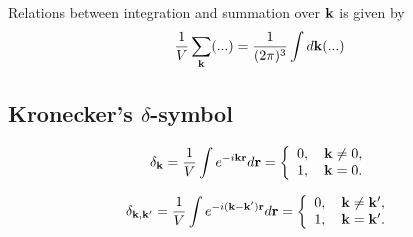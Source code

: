 Relations between integration and summation over $\vb k$ is given by
\begin{equation}
	\frac{1}{V}\sum_{\vb k} (...) = \frac{1}{(2\pi)^3}\int d{\vb k} (...)
\end{equation}

\subsection*{Kronecker's $\delta$-symbol}

\begin{equation}
	\delta_{\vb k} = \frac{1}{V} \int e^{-i\vb k \vb r} d{\vb r} = 
	\left\{
	\begin{array}{cc}
		0, \quad \vb k \neq 0, \\
		1, \quad \vb k = 0.
	\end{array}
	\right.
\end{equation}

\begin{equation}
	\delta_{\vb k, \vb k'} = \frac{1}{V} \int e^{-i(\vb k - \vb k') \vb r} d{\vb r} = 
	\left\{
	\begin{array}{cc}
		0, \quad \vb k \neq \vb k', \\
		1, \quad \vb k = \vb k'.
	\end{array}
	\right.
\end{equation}